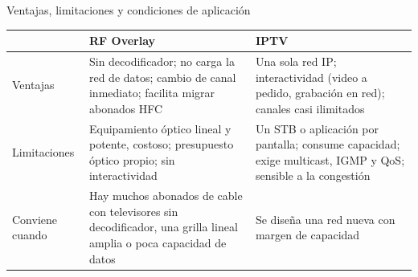 \begin{frame}{Ventajas, limitaciones y condiciones de aplicación}
  \centering
  \scriptsize
  \renewcommand{\arraystretch}{1.15}
  \begin{tabular}{p{2.2cm}>{\raggedright\arraybackslash}p{4.8cm}>{\raggedright\arraybackslash}p{4.8cm}}
    \toprule
    & \textbf{RF Overlay} & \textbf{IPTV} \\
    \midrule
    Ventajas & Sin decodificador; no carga la red de datos; cambio de canal inmediato; facilita migrar abonados HFC & Una sola red IP; interactividad (video a pedido, grabación en red); canales casi ilimitados \\
    \midrule
    Limitaciones & Equipamiento óptico lineal y potente, costoso; presupuesto óptico propio; sin interactividad & Un STB o aplicación por pantalla; consume capacidad; exige multicast, IGMP y QoS; sensible a la congestión \\
    \midrule
    Conviene cuando & Hay muchos abonados de cable con televisores sin decodificador, una grilla lineal amplia o poca capacidad de datos & Se diseña una red nueva con margen de capacidad \\
    \bottomrule
  \end{tabular}
\end{frame}

